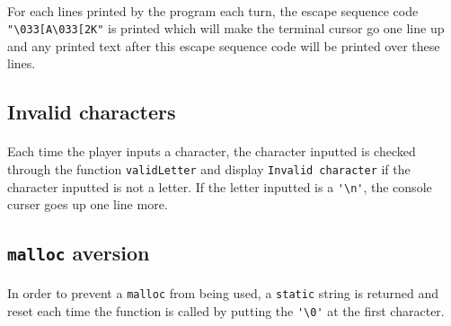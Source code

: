 \documentclass{report}
\begin{document}
\paragraph{} For each lines printed by the program each turn, the escape
sequence code \lstinline[style=prog]|"\033[A\033[2K"| is printed which will
	make the terminal cursor go one line up and any printed text after this
	escape sequence code will be printed over these lines.

\subsection{Invalid characters}

\paragraph{} Each time the player inputs a character, the character inputted is
checked through the function \lstinline[style=prog]|validLetter| and display
\texttt{Invalid character} if the character inputted is not a letter. If the
letter inputted is a \lstinline[style=prog]|'\n'|, the console curser goes up
one line more.

\subsection{\texttt{malloc} aversion}

\paragraph{} In order to prevent a \lstinline[style=prog]|malloc| from being
used, a \lstinline[style=prog]|static| string is returned and reset each time
the function is called by putting the \lstinline[style=prog]|'\0'| at the first
character.
\end{document}
